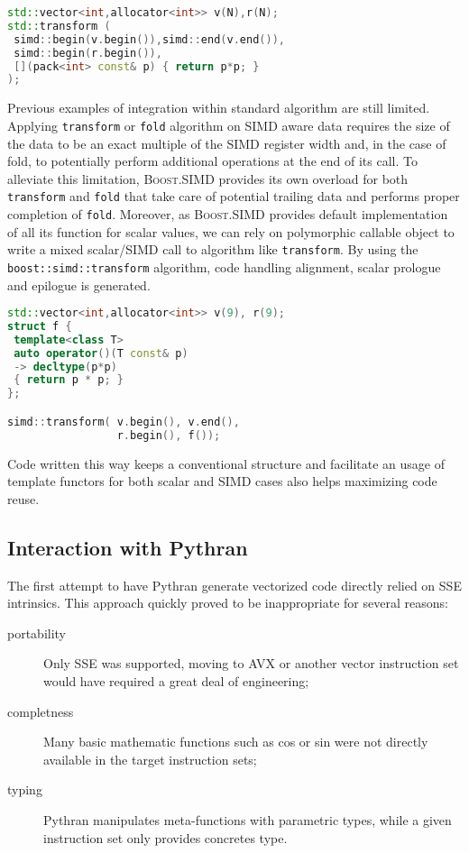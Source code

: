 \documentclass[10pt]{sigplanconf}
\providecommand{\boostsimd}{\textsc{Boost.SIMD}}
\begin{document}
\begin{lstlisting}[language=c++, label={lst:stl_example}, caption={SIMD Iterator with STL algorithm},label=stl_example]
std::vector<int,allocator<int>> v(N),r(N);
std::transform (
 simd::begin(v.begin()),simd::end(v.end()),
 simd::begin(r.begin()),
 [](pack<int> const& p) { return p*p; } 
);
\end{lstlisting}

Previous examples of integration within standard algorithm are still limited.
Applying \texttt{transform} or \texttt{fold} algorithm on SIMD aware data
requires the size of the data to be an exact multiple of the SIMD register width
and, in the case of fold, to potentially perform additional operations at the
end of its call. To alleviate this limitation, \boostsimd{}
provides its own overload for both \texttt{transform} and \texttt{fold} that take
care of potential trailing data and performs proper completion of \texttt{fold}.
Moreover, as \boostsimd{} provides default implementation of all its function for scalar values,
we can rely on polymorphic callable object to write a mixed scalar/SIMD call to algorithm
like \texttt{transform}. By using the \texttt{boost::simd::transform} algorithm, code
handling alignment, scalar prologue and epilogue is generated.

\begin{lstlisting}[language=c++, label={lst:square-cxx}, caption={Polymorphic SIMD algorithm call},label=stl_poly]
std::vector<int,allocator<int>> v(9), r(9);
struct f {
 template<class T>
 auto operator()(T const& p)
 -> decltype(p*p)
 { return p * p; }
};

simd::transform( v.begin(), v.end(),
                 r.begin(), f());
\end{lstlisting}


Code written this way keeps a conventional structure and facilitate an usage of template
functors for both scalar and SIMD cases also helps maximizing code reuse.

\subsection{Interaction with Pythran}

The first attempt to have Pythran generate vectorized code directly relied on
SSE intrinsics. This approach quickly proved to be inappropriate for several
reasons:

\begin{description}

    \item[portability] Only SSE was supported, moving to AVX or another vector
        instruction set would have required a great deal of engineering;

    \item[completness] Many basic mathematic functions such as cos or sin
        were not directly available in the target instruction sets;

    \item[typing] Pythran manipulates meta-functions with parametric types,
        while a given instruction set only provides concretes type.

\end{description}
\end{document}
